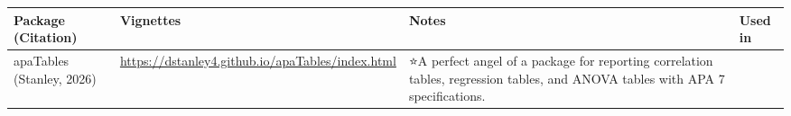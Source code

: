 \documentclass[
  letterpaper,
  DIV=11,
  numbers=noendperiod]{scrreprt}
\begin{document}
\begin{longtable}[]{@{}
  >{\raggedright\arraybackslash}p{}
  >{\raggedright\arraybackslash}p{}
  >{\raggedright\arraybackslash}p{}
  >{\raggedright\arraybackslash}p{}@{}}
\toprule\noalign{}
\begin{minipage}[b]{\linewidth}\raggedright
Package (Citation)
\end{minipage} & \begin{minipage}[b]{\linewidth}\raggedright
Vignettes
\end{minipage} & \begin{minipage}[b]{\linewidth}\raggedright
Notes
\end{minipage} & \begin{minipage}[b]{\linewidth}\raggedright
Used in
\end{minipage} \\
\midrule\noalign{}
\endhead
\bottomrule\noalign{}
\endlastfoot
apaTables (Stanley, 2026) &
\url{https://dstanley4.github.io/apaTables/index.html} & ⭐A perfect
angel of a package for reporting correlation tables, regression tables,
and ANOVA tables with APA 7 specifications.


\end{longtable}
\end{document}
